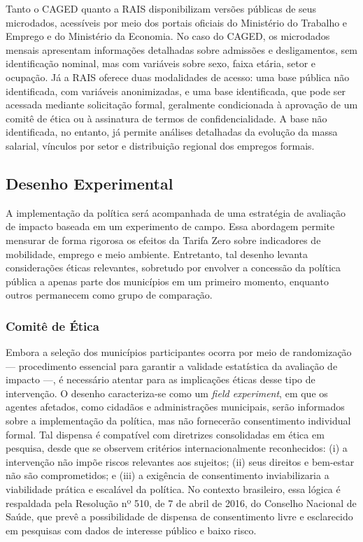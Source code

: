 Tanto o CAGED quanto a RAIS disponibilizam versões públicas de seus microdados, acessíveis por meio dos portais oficiais do Ministério do Trabalho e Emprego e do Ministério da Economia. No caso do CAGED, os microdados mensais apresentam informações detalhadas sobre admissões e desligamentos, sem identificação nominal, mas com variáveis sobre sexo, faixa etária, setor e ocupação. Já a RAIS oferece duas modalidades de acesso: uma base pública não identificada, com variáveis anonimizadas, e uma base identificada, que pode ser acessada mediante solicitação formal, geralmente condicionada à aprovação de um comitê de ética ou à assinatura de termos de confidencialidade. A base não identificada, no entanto, já permite análises detalhadas da evolução da massa salarial, vínculos por setor e distribuição regional dos empregos formais.

\subsection{Desenho Experimental}

A implementação da política será acompanhada de uma estratégia de avaliação de impacto baseada em um experimento de campo. Essa abordagem permite mensurar de forma rigorosa os efeitos da Tarifa Zero sobre indicadores de mobilidade, emprego e meio ambiente. Entretanto, tal desenho levanta considerações éticas relevantes, sobretudo por envolver a concessão da política pública a apenas parte dos municípios em um primeiro momento, enquanto outros permanecem como grupo de comparação.

\subsubsection{Comitê de Ética}

Embora a seleção dos municípios participantes ocorra por meio de randomização — procedimento essencial para garantir a validade estatística da avaliação de impacto —, é necessário atentar para as implicações éticas desse tipo de intervenção. O desenho caracteriza-se como um \textit{field experiment}, em que os agentes afetados, como cidadãos e administrações municipais, serão informados sobre a implementação da política, mas não fornecerão consentimento individual formal. Tal dispensa é compatível com diretrizes consolidadas em ética em pesquisa, desde que se observem critérios internacionalmente reconhecidos: (i) a intervenção não impõe riscos relevantes aos sujeitos; (ii) seus direitos e bem-estar não são comprometidos; e (iii) a exigência de consentimento inviabilizaria a viabilidade prática e escalável da política. No contexto brasileiro, essa lógica é respaldada pela Resolução nº 510, de 7 de abril de 2016, do Conselho Nacional de Saúde, que prevê a possibilidade de dispensa de consentimento livre e esclarecido em pesquisas com dados de interesse público e baixo risco\cite{CNS_2016}.

